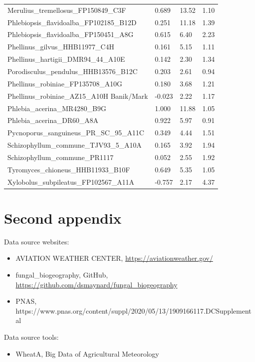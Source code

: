 \documentclass{mcmthesis}
\begin{document}
\begin{appendices}
\begin{table}[h]
\begin{tabular}{p{}p{}p{}p{}}
		Merulius\_tremellosus\_FP150849\_C3F & 0.689  & 13.52  & 1.10 \\ 
		Phlebiopsis\_flavidoalba\_FP102185\_B12D & 0.251  & 11.18  & 1.39 \\ 
		Phlebiopsis\_flavidoalba\_FP150451\_A8G & 0.615  & 6.40  & 2.23 \\ 
		Phellinus\_gilvus\_HHB11977\_C4H & 0.161  & 5.15  & 1.11 \\ 
		Phellinus\_hartigii\_DMR94\_44\_A10E & 0.142  & 2.30  & 1.34 \\ 
		Porodisculus\_pendulus\_HHB13576\_B12C & 0.203  & 2.61  & 0.94 \\ 
		Phellinus\_robiniae\_FP135708\_A10G & 0.180  & 3.68  & 1.21 \\ 
		Phellinus\_robiniae\_AZ15\_A10H Banik/Mark & -0.023  & 2.22  & 1.17 \\ 
		Phlebia\_acerina\_MR4280\_B9G & 1.000  & 11.88  & 1.05 \\ 
		Phlebia\_acerina\_DR60\_A8A & 0.922  & 5.97  & 0.91 \\ 
		Pycnoporus\_sanguineus\_PR\_SC\_95\_A11C & 0.349  & 4.44  & 1.51 \\ 
		Schizophyllum\_commune\_TJV93\_5\_A10A & 0.165  & 3.92  & 1.94 \\ 
		Schizophyllum\_commune\_PR1117 & 0.052  & 2.55  & 1.92 \\ 
		Tyromyces\_chioneus\_HHB11933\_B10F & 0.649  & 5.35  & 1.05 \\ 
		Xylobolus\_subpileatus\_FP102567\_A11A & -0.757  & 2.17  & 4.37 \\ 
		\hline
	\end{tabular}
\end{table}
\newpage
\section{Second appendix}
Data source websites:
\begin{itemize}
	\item 
	AVIATION WEATHER CENTER, \href{}{https://aviationweather.gov/}
	\item 
	fungal\_biogeography, GitHub, \href{}{https://github.com/dsmaynard/fungal\_biogeography} 
	\item
	PNAS, https://www.pnas.org/content/suppl/2020/05/13/1909166117.DCSupplemental
\end{itemize}

Data source tools:
\begin{itemize}
	\item 
	WheatA, Big Data of Agricultural Meteorology
\end{itemize}

\end{appendices}
\end{document}
